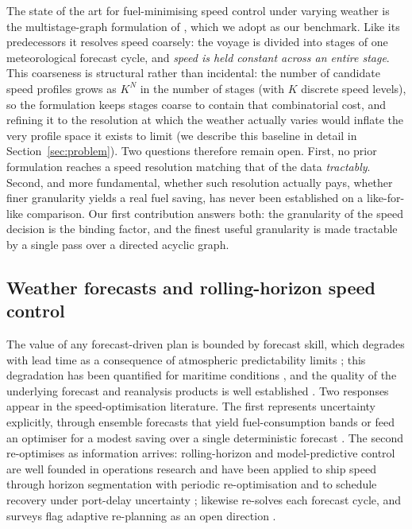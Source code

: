 \documentclass[review,authoryear]{elsarticle}
\begin{document}
The state of the art for fuel-minimising speed control under varying weather is the multistage-graph
formulation of \citet{luo2024}, which we adopt as our benchmark. Like its predecessors it resolves
speed coarsely: the voyage is divided into stages of one meteorological forecast cycle, and \emph{speed
is held constant across an entire stage}. This coarseness is structural rather than incidental: the
number of candidate speed profiles grows as $K^{N}$ in the number of stages (with $K$ discrete speed
levels), so the formulation keeps stages coarse to contain that combinatorial cost, and refining it to
the resolution at which the weather actually varies would inflate the very profile space it exists to
limit (we describe this baseline in detail in Section~\ref{sec:problem}). Two questions therefore remain
open. First, no prior formulation reaches a speed resolution matching that of the data
\emph{tractably}. Second, and
more fundamental, whether such resolution actually pays, whether finer granularity yields a real
fuel saving, has never been established on a like-for-like comparison. Our first contribution
answers both: the granularity of the speed decision is the binding factor, and the finest useful
granularity is made tractable by a single pass over a directed acyclic graph.

\subsection{Weather forecasts and rolling-horizon speed control}
The value of any forecast-driven plan is bounded by forecast skill, which degrades with lead time as a
consequence of atmospheric predictability limits \citep{Lorenz1969}; this degradation has been
quantified for maritime conditions \citep{Marjanovic2025}, and the quality of the underlying forecast
and reanalysis products is well established \citep{Stopa2014}. Two responses appear in the
speed-optimisation literature. The first represents uncertainty explicitly, through ensemble forecasts
that yield fuel-consumption bands \citep{Vettor2022} or feed an optimiser for a modest saving over a
single deterministic forecast \citep{Luo2023}. The second re-optimises as information arrives:
rolling-horizon and model-predictive control are well founded in operations research
\citep{Sethi1991} and have been applied to ship speed through horizon segmentation with periodic
re-optimisation \citep{Tzortzis2021} and to schedule recovery under port-delay uncertainty
\citep{Zheng2023}; \citet{luo2024} likewise re-solves each forecast cycle, and surveys flag adaptive
re-planning as an open direction \citep{Zis2020}.
\end{document}
